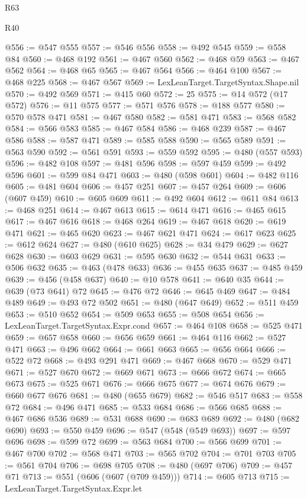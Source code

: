 \begin{lexlean}{R63}
\begin{lexlean}{R40}
\begin{coremodule}
{{{{{{{{{{{{{{{{{{{{{{{{{{{{{{{{{{{{{{{{{{{{{{{{{{{{{{{{{{{{{{{{{{{{{{{{{{{{{{{{{{{{{{{{{{{{{{{{{{{{{{{{{{{{{@556 := @547 @555
@557 := @546 @556
@558 := @492 @545
@559 := @558 @84
@560 := @468 @192
@561 := @467 @560
@562 := @468 @59
@563 := @467 @562
@564 := @468 @65
@565 := @467 @564
@566 := @464 @100
@567 := @468 @225
@568 := @467 @567
@569 := LexLeanTarget.TargetSyntax.Shape.nil
@570 := @492 @569
@571 := @415 @60
@572 := 25
@575 := @14 @572 (@17 @572)
@576 := @11 @575
@577 := @571 @576
@578 := @188 @577
@580 := @570 @578 @471
@581 := @467 @580
@582 := @581 @471
@583 := @568 @582
@584 := @566 @583
@585 := @467 @584
@586 := @468 @239
@587 := @467 @586
@588 := @587 @471
@589 := @585 @588
@590 := @565 @589
@591 := @563 @590
@592 := @561 @591
@593 := @559 @592
@595 := @480 (@557 @593)
@596 := @482 @108
@597 := @481 @596
@598 := @597 @459
@599 := @492 @596
@601 := @599 @84 @471
@603 := @480 (@598 @601)
@604 := @482 @116
@605 := @481 @604
@606 := @457 @251
@607 := @457 @264
@609 := @606 (@607 @459)
@610 := @605 @609
@611 := @492 @604
@612 := @611 @84
@613 := @468 @251
@614 := @467 @613
@615 := @614 @471
@616 := @465 @615
@617 := @467 @616
@618 := @468 @264
@619 := @467 @618
@620 := @619 @471
@621 := @465 @620
@623 := @467 @621 @471
@624 := @617 @623
@625 := @612 @624
@627 := @480 (@610 @625)
@628 := @34 @479
@629 := @627 @628
@630 := @603 @629
@631 := @595 @630
@632 := @544 @631
@633 := @506 @632
@635 := @463 (@478 @633)
@636 := @455 @635
@637 := @485 @459
@639 := @456 (@458 @637)
@640 := @10 @578
@641 := @640 @35
@644 := @639 (@73 @641) @72
@645 := @476 @72
@646 := @645 @469
@647 := @484 @489
@649 := @493 @72 @502
@651 := @480 (@647 @649)
@652 := @511 @459
@653 := @510 @652
@654 := @509 @653
@655 := @508 @654
@656 := LexLeanTarget.TargetSyntax.Expr.cond
@657 := @464 @108
@658 := @525 @471
@659 := @657 @658
@660 := @656 @659
@661 := @464 @116
@662 := @527 @471
@663 := @496 @662
@664 := @661 @663
@665 := @656 @664
@666 := @522 @72
@668 := @493 @291 @471
@669 := @467 @668
@670 := @529 @471
@671 := @527 @670
@672 := @669 @671
@673 := @666 @672
@674 := @665 @673
@675 := @525 @671
@676 := @666 @675
@677 := @674 @676
@679 := @660 @677 @676
@681 := @480 (@655 @679)
@682 := @546 @517
@683 := @558 @72
@684 := @496 @471
@685 := @533 @684
@686 := @566 @685
@688 := @467 @686 @536
@689 := @531 @688
@690 := @683 @689
@692 := @480 (@682 @690)
@693 := @550 @459
@696 := @547 (@548 (@549 @693))
@697 := @597 @696
@698 := @599 @72
@699 := @563 @684
@700 := @566 @699
@701 := @467 @700
@702 := @568 @471
@703 := @565 @702
@704 := @701 @703
@705 := @561 @704
@706 := @698 @705
@708 := @480 (@697 @706)
@709 := @457 @71
@713 := @551 (@606 (@607 (@709 @459)))
@714 := @605 @713
@715 := LexLeanTarget.TargetSyntax.Expr.let
}}}}}}}}}}}}}}}}}}}}}}}}}}}}}}}}}}}}}}}}}}}}}}}}}}}}}}}}}}}}}}}}}}}}}}}}}}}}}}}}}}}}}}}}}}}}}}}}}}}}}}}}}}}}}
\end{coremodule}
\end{lexlean}
\end{lexlean}
